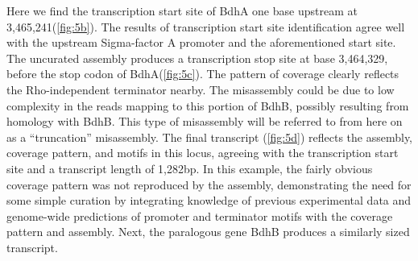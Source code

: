 Here we find the transcription start site of BdhA one base upstream at 3,465,241(\ref{fig:5b}). The results of transcription start site identification agree well with the upstream Sigma-factor A promoter and the aforementioned start site. The uncurated assembly produces a transcription stop site at base 3,464,329, before the stop codon of BdhA(\ref{fig:5c}). The pattern of coverage clearly reflects the Rho-independent terminator nearby. The misassembly could be due to low complexity in the reads mapping to this portion of BdhB, possibly resulting from homology with BdhB. This type of misassembly will be referred to from here on as a ``truncation'' misassembly. The final transcript (\ref{fig:5d}) reflects the assembly, coverage pattern, and motifs in this locus, agreeing with the transcription start site and a transcript length of 1,282bp. In this example, the fairly obvious coverage pattern was not reproduced by the assembly, demonstrating the need for some simple curation by integrating knowledge of previous experimental data and genome-wide predictions of promoter and terminator motifs with the coverage pattern and assembly. Next, the paralogous gene BdhB produces a similarly sized transcript.
